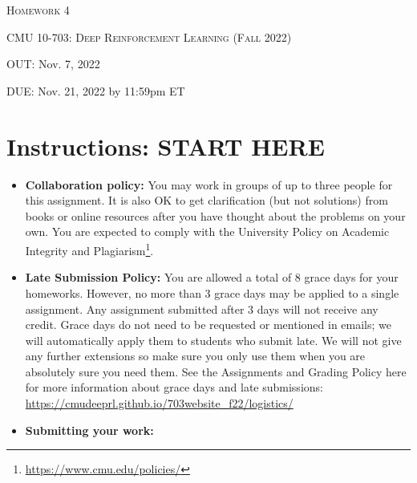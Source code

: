 \documentclass[12pt]{article}
\begin{document}
\section*{}
\begin{center}
  \centerline{\textsc{\LARGE  Homework 4}}
  \vspace{1em}
  \textsc{\large CMU 10-703: Deep Reinforcement Learning (Fall 2022)} \\
  \centerline{OUT: Nov. 7, 2022}
  \centerline{DUE: Nov. 21, 2022 by 11:59pm ET}
\end{center}

\section*{Instructions: START HERE}
\begin{itemize}
\item \textbf{Collaboration policy:} You may work in groups of up to three people for this assignment. It is also OK to get clarification (but not solutions) from books or online resources after you have thought about the problems on your own.  You are expected to comply with the University Policy on Academic Integrity and Plagiarism\footnote{\url{https://www.cmu.edu/policies/}}.

\item\textbf{Late Submission Policy:} You are allowed a total of 8 grace days for your homeworks. However, no more than 3 grace days may be applied to a single assignment. Any assignment submitted after 3 days will not receive any credit.  Grace days do not need to be requested or mentioned in emails; we will automatically apply them to students who submit late. We will not give any further extensions so make sure you only use them when you are absolutely sure you need them.  See the Assignments and Grading Policy here for more information about grace days and late submissions: \url{https://cmudeeprl.github.io/703website_f22/logistics/}

\item\textbf{Submitting your work:} 

\begin{itemize}



\end{itemize}
\end{itemize}
\end{document}
